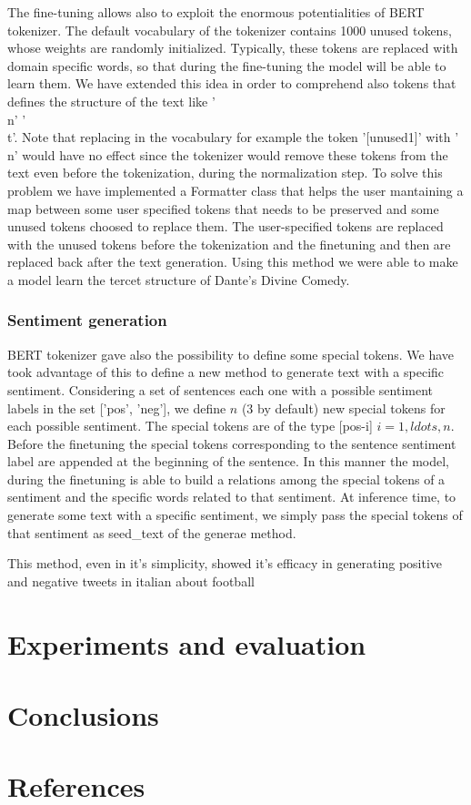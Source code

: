 \documentclass[10pt,twocolumn,letterpaper]{article}
\begin{document}
The fine-tuning allows also to exploit the enormous potentialities of BERT tokenizer.
The default vocabulary of the tokenizer contains 1000 unused tokens,
whose weights are randomly initialized.
Typically, these tokens are replaced with domain specific words,
so that during the fine-tuning the model will be able to learn them.
We have extended this idea in order to comprehend also tokens that defines
the structure of the text like '\\n' '\\t'. Note that replacing in the vocabulary for example the token '[unused1]' with '\\n' would have no effect since the tokenizer would remove these tokens from the text even before the tokenization, during the normalization step. To solve this problem we have implemented a Formatter class that helps the user mantaining a map between some user specified tokens that needs to be preserved and some unused tokens choosed to replace them. The user-specified tokens are replaced with the unused tokens before the tokenization and the finetuning and then are replaced back after the text generation. Using this method we were able to make a model learn the tercet structure of Dante's Divine Comedy.

\subsubsection{Sentiment generation}
BERT tokenizer gave also the possibility to define some special tokens. We have took advantage of this to define a new method to generate text with a specific sentiment.
Considering a set of sentences each one with a possible sentiment  labels in the set ['pos', 'neg'], we define $n$ (3 by default) new special tokens for each possible sentiment. The special tokens are of the type [pos-i] $i=1,
ldots,n$. Before the finetuning the special tokens corresponding to the sentence sentiment label are appended at the beginning of the sentence. In this manner the model, during the finetuning is able to build a relations among the special tokens of a sentiment and the specific words related to that sentiment. At inference time, to generate some text with a specific sentiment, we simply pass the special tokens of that sentiment as seed\_text of the generae method.

This method, even in it's simplicity, showed it's efficacy in generating positive and negative tweets in italian about football

\section{Experiments and evaluation}

\section{Conclusions}

\section*{References}
\end{document}
